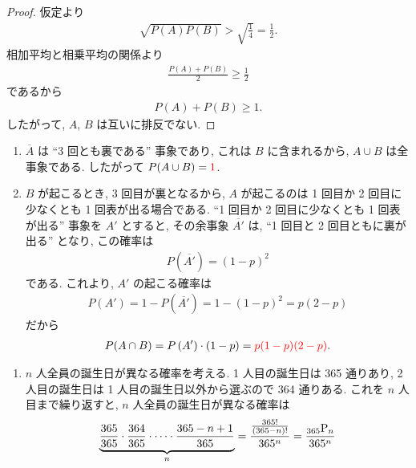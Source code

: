 \vspace{\baselineskip}
\stepup
\begin{qenumerate}
	\item{
		\begin{proof}
			仮定より
			\begin{align}
				\sqrt{P(A)P(B)}>\sqrt{\frac{1}{4}}=\frac{1}{2}.
			\end{align}
			相加平均と相乗平均の関係より
			\begin{align}
				\frac{P(A) + P(B)}{2}\geq\frac{1}{2}
			\end{align}
			であるから
			\begin{align}
				P(A) + P(B) \geq 1.
			\end{align}
			したがって, $A$, $B$ は互いに排反でない.
		\end{proof}
	}
	\item{
		\begin{enumerate}
			\item{
				$\overline{A}$ は ``3 回とも裏である'' 事象であり, これは $B$ に含まれるから, $A\cup B$ は全事象である.
				したがって $P(A\cup B) = \textcolor{red}{1}$.
			}
			\item{
				$B$ が起こるとき, 3 回目が裏となるから, $A$ が起こるのは 1 回目か 2 回目に少なくとも 1 回表が出る場合である.
				``1 回目か 2 回目に少なくとも 1 回表が出る'' 事象を $A'$ とすると, その余事象 $\overline{A'}$ は, ``1 回目と 2 回目ともに裏が出る'' となり, この確率は
				\begin{align}
					P\left(\overline{A'}\right) = (1-p)^{2}
				\end{align}
				である.
				これより, $A'$ の起こる確率は
				\begin{align}
					P\left(A'\right) = 1 - P\left(\overline{A'}\right) = 1 - (1 - p)^{2} = p(2 - p)
				\end{align}
				だから
				\begin{align}
					P(A\cap B) = P\left(A'\right)\cdot(1 - p) = \textcolor{red}{p(1-p)(2-p)}.
				\end{align}
			}
		\end{enumerate}
	}
	\item{
		\begin{enumerate}
			\item{
				$n$ 人全員の誕生日が異なる確率を考える.
				1 人目の誕生日は 365 通りあり, 2 人目の誕生日は 1 人目の誕生日以外から選ぶので 364 通りある.
				これを $n$ 人目まで繰り返すと, $n$ 人全員の誕生日が異なる確率は
				\begin{align}
					\underbrace{\frac{365}{365}\cdot\frac{364}{365}\cdot\cdots\cdot\frac{365 - n + 1}{365}}_{n} = \frac{\frac{365!}{(365-n)!}}{365^{n}} = \frac{\permu{365}{n}}{365^{n}}

\end{align}}
\end{enumerate}}
\end{qenumerate}
